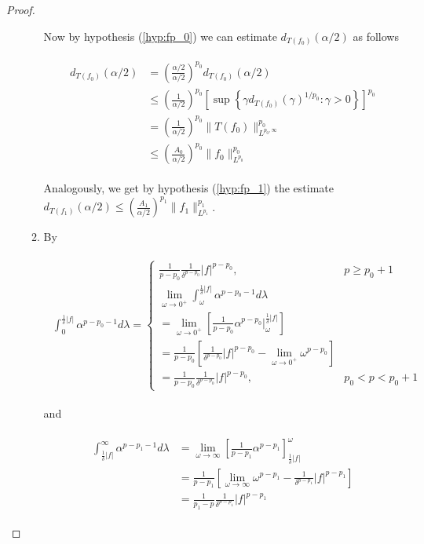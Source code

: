 \begin{proof}
\begin{enumerate}[label = \textbf{(\roman*.)}]
\begin{enumerate}[label = \textbf{\alph*.}]
Now by hypothesis (\ref{hyp:fp_0}) we can estimate $d_{T(f_0)}(\alpha/2)$ as follows

\begin{gather}
	\begin{aligned}
		d_{T(f_0)}(\alpha/2) &= \left(\frac{\alpha/2}{\alpha/2}\right)^{p_0} d_{T(f_0)}(\alpha/2)\\
		&\leqslant \left(\frac{1}{\alpha/2}\right)^{p_0} \left[\sup\left\{ \gamma d_{T(f_0)}(\gamma)^{1/p_0}: \gamma > 0\right\}\right]^{p_0}\\
	 & = \left(\frac{1}{\alpha/2}\right)^{p_0} \|T(f_0)\|^{p_0}_{L^{p_0,\infty}}\\
	 & \leqslant \left(\frac{A_0}{\alpha/2}\right)^{p_0} \|f_0\|^{p_0}_{L^{p_0}}
	\label{est:p_0}
	\end{aligned}
\end{gather}

Analogously, we get by hypothesis (\ref{hyp:fp_1}) the estimate $d_{T(f_1)}(\alpha/2) \leqslant \left(\frac{A_1}{\alpha/2}\right)^{p_1} \|f_1\|^{p_1}_{L^{p_1}}\label{est:p_1}$.

	\item By

		\begin{gather}
			\begin{aligned}
				\int_0^{\frac{1}{\delta}\vert f\vert}\alpha^{p-p_0-1} d\lambda = 
				\begin{cases}
					\frac{1}{p-p_0}\frac{1}{\delta^{p-p_0}}\vert f \vert^{p - p_0}, & p \geqslant p_0 + 1\\
					\lim\limits_{\omega \rightarrow 0^+} \int_\omega^{\frac{1}{\delta}\vert f\vert}\alpha^{p-p_0-1} d\lambda\\
					= \lim\limits_{\omega \rightarrow 0^+}\left[\frac{1}{p-p_0}\alpha^{p - p_0}\big\vert_\omega^{\frac{1}{\delta}\vert f\vert}\right]\\
					= \frac{1}{p-p_0}\left[\frac{1}{\delta^{p-p_0}}\vert f \vert^{p - p_0} - \lim\limits_{\omega \rightarrow 0^+} \omega^{p-p_0}\right]\\
					= \frac{1}{p-p_0}\frac{1}{\delta^{p-p_0}} \vert f\vert^{p - p_0}, & p_0 < p < p_0 + 1
				\end{cases}
			\end{aligned}
		\end{gather}

		and

		\begin{gather}
			\begin{aligned}
				\int_{\frac{1}{\delta}\vert f\vert}^{\infty}\alpha^{p-p_1-1} d\lambda &= \lim_{\omega \rightarrow \infty} \left[ \frac{1}{p - p_1} \alpha^{p - p_1}\right]^\omega_{\frac{1}{\delta}\vert f\vert}\\
				&= \frac{1}{p - p_1} \left[  \lim_{\omega \rightarrow \infty} \omega^{p - p_1} - \frac{1}{\delta^{p - p_1}} \vert f\vert^{p - p_1}\right]\\
				&= \frac{1}{p_1 - p}\frac{1}{\delta^{p-p_1}} \vert f \vert^{p - p_1}
			\end{aligned}
		\end{gather}


\end{enumerate}
\end{enumerate}
\end{proof}
